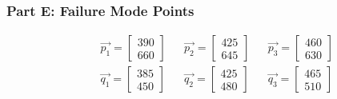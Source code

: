 \documentclass[11pt]{article}
\begin{document}
    \hypertarget{part-e-failure-mode-points}{%
\subsubsection{Part E: Failure Mode
Points}\label{part-e-failure-mode-points}}

\begin{align} &&\vec{p_1}=\begin{bmatrix} 390 \\ 660 \end{bmatrix} &&\vec{p_2}=\begin{bmatrix} 425 \\ 645 \end{bmatrix} &&\vec{p_3}=\begin{bmatrix} 460 \\ 630 \end{bmatrix}\\ &&\vec{q_1}=\begin{bmatrix} 385 \\ 450 \end{bmatrix} &&\vec{q_2}=\begin{bmatrix} 425 \\ 480 \end{bmatrix} &&\vec{q_3}=\begin{bmatrix} 465 \\ 510 \end{bmatrix} \end{align}
\end{document}
